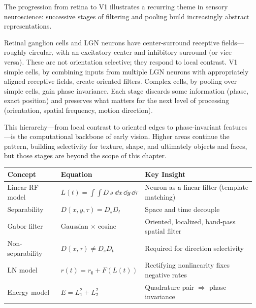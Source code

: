 The progression from retina to V1 illustrates a recurring theme in sensory neuroscience: successive stages of filtering and pooling build increasingly abstract representations.

Retinal ganglion cells and LGN neurons have center-surround receptive fields---roughly circular, with an excitatory center and inhibitory surround (or vice versa). These are not orientation selective; they respond to local contrast. V1 simple cells, by combining inputs from multiple LGN neurons with appropriately aligned receptive fields, create oriented filters. Complex cells, by pooling over simple cells, gain phase invariance. Each stage discards some information (phase, exact position) and preserves what matters for the next level of processing (orientation, spatial frequency, motion direction).

This hierarchy---from local contrast to oriented edges to phase-invariant features---is the computational backbone of early vision. Higher areas continue the pattern, building selectivity for texture, shape, and ultimately objects and faces, but those stages are beyond the scope of this chapter.


\begin{chaptersummary}

\begin{center}
\renewcommand{\arraystretch}{1.6}
\begin{tabularx}{\textwidth}{@{}l X X@{}}
  \toprule
  \textbf{Concept} & \textbf{Equation} & \textbf{Key Insight} \\
  \midrule
  Linear RF model &
  $\displaystyle L(t) = \int\!\!\int D\, s\;\dd x\,\dd y\,\dd\tau$ &
  Neuron as a linear filter (template matching) \\
  Separability &
  $D(x,y,\tau) = D_s D_t$ &
  Space and time decouple \\
  Gabor filter &
  Gaussian $\times$ cosine &
  Oriented, localized, band-pass spatial filter \\
  Non-separability &
  $D(x,\tau) \neq D_s D_t$ &
  Required for direction selectivity \\
  LN model &
  $r(t) = r_0 + F(L(t))$ &
  Rectifying nonlinearity fixes negative rates \\
  Energy model &
  $E = L_1^2 + L_2^2$ &
  Quadrature pair $\Rightarrow$ phase invariance \\
  \bottomrule
\end{tabularx}
\end{center}

\end{chaptersummary}

